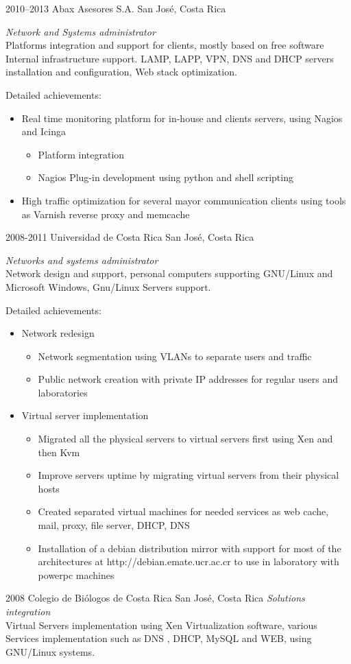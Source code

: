\documentclass[]{friggeri-cv}
\begin{document}
\begin{entrylist}


\entry
{2010--2013}
{Abax Asesores S.A.}
{San José, Costa Rica}
{\emph{Network and Systems administrator}\\
Platforms integration and support for clients, mostly based on free software Internal infrastructure support.
LAMP, LAPP, VPN, DNS and DHCP servers installation and configuration, Web stack optimization.

Detailed achievements:
\begin{itemize}
\item Real time monitoring platform for in-house and clients servers, using Nagios and Icinga
\begin{itemize}
\item Platform integration
\item Nagios Plug-in development using python and shell scripting
\end{itemize}
\item High traffic optimization for several mayor communication clients using tools as Varnish reverse proxy and memcache
\end{itemize}
}
\entry
{2008-2011}
{Universidad de Costa Rica}
{San José, Costa Rica}
{\emph{Networks and systems administrator}\\
Network design and support, personal computers supporting GNU/Linux and Microsoft Windows, Gnu/Linux Servers support.

Detailed achievements:
\begin{itemize}
\item Network redesign
\begin{itemize}
\item Network segmentation using VLANs to separate users and traffic
\item Public network creation with private IP addresses for regular users and laboratories
\end{itemize}
\item Virtual server implementation
\begin{itemize}
\item Migrated all the physical servers to virtual servers first using Xen and then Kvm
\item Improve servers uptime by migrating virtual servers from their physical hosts
\item Created separated virtual machines for needed services as web cache, mail, proxy, file server, DHCP, DNS
\item Installation of a debian distribution mirror with support for most of the architectures at http://debian.emate.ucr.ac.cr to use in laboratory with powerpc machines
\end{itemize}
\end{itemize}
}
\entry
{2008}
{Colegio de Biólogos de Costa Rica}
{San José, Costa Rica}
{\emph{Solutions integration}\\
Virtual Servers implementation using Xen Virtualization software, various Services implementation such as DNS , DHCP, MySQL and WEB, using GNU/Linux systems.
}


\end{entrylist}
\end{document}
